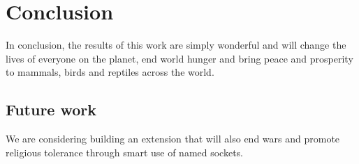 
\chapter*{Conclusion}

In conclusion, the results of this work are simply wonderful and will change the lives of everyone on the planet,
end world hunger and bring peace and prosperity to mammals, birds and reptiles across the world.

\section*{Future work}

We are considering building an extension that will also end wars and promote religious tolerance through smart use
of named sockets.
